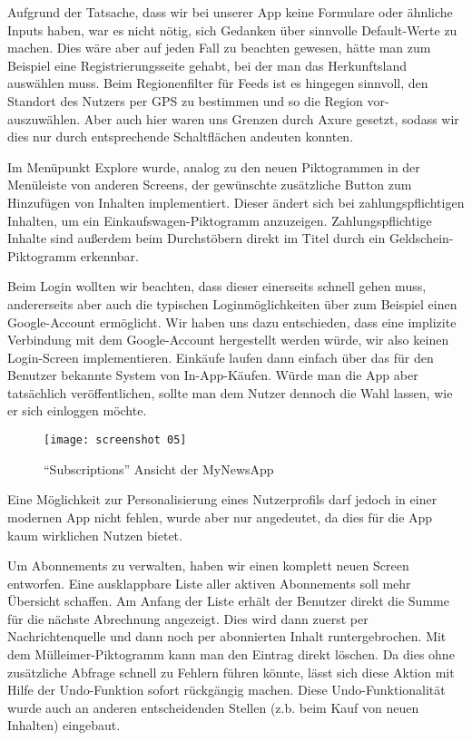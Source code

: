 Aufgrund der Tatsache, dass wir bei unserer App keine Formulare oder ähnliche Inputs haben, war es nicht nötig, sich Gedanken über sinnvolle Default-Werte zu machen. Dies wäre aber auf jeden Fall zu beachten gewesen, hätte man zum Beispiel eine Registrierungsseite gehabt, bei der man das Herkunftsland auswählen muss. Beim Regionenfilter für Feeds ist es hingegen sinnvoll, den Standort des Nutzers per GPS zu bestimmen und so die Region vor- auszuwählen. Aber auch hier waren uns Grenzen durch Axure gesetzt, sodass wir dies nur durch entsprechende Schaltflächen andeuten konnten.

Im Menüpunkt Explore wurde, analog zu den neuen Piktogrammen in der Menüleiste von anderen Screens, der gewünschte zusätzliche Button zum Hinzufügen von Inhalten implementiert. Dieser ändert sich bei zahlungspflichtigen Inhalten, um ein Einkaufswagen-Piktogramm anzuzeigen. Zahlungspflichtige Inhalte sind außerdem beim Durchstöbern direkt im Titel durch ein Geldschein-Piktogramm erkennbar.

Beim Login wollten wir beachten, dass dieser einerseits schnell gehen muss, andererseits aber auch die typischen Loginmöglichkeiten über zum Beispiel einen Google-Account ermöglicht. Wir haben uns dazu entschieden, dass eine implizite Verbindung mit dem Google-Account hergestellt werden würde, wir also keinen Login-Screen implementieren. Einkäufe laufen dann einfach über das für den Benutzer bekannte System von In-App-Käufen. Würde man die App aber tatsächlich veröffentlichen, sollte man dem Nutzer dennoch die Wahl lassen, wie er sich einloggen möchte.

\clearpage

\begin{wrapfigure}{L}{0.45\textwidth}
  \centering
  \texttt{[image: screenshot 05]}
  \caption{\enquote{Subscriptions} Ansicht der MyNewsApp}
  \label{fig:screenshot-05}
\end{wrapfigure}

Eine Möglichkeit zur Personalisierung eines Nutzerprofils darf jedoch in einer modernen App nicht fehlen, wurde aber nur angedeutet, da dies für die App kaum wirklichen Nutzen bietet.

Um Abonnements zu verwalten, haben wir einen komplett neuen Screen entworfen. Eine ausklappbare Liste aller aktiven Abonnements soll mehr Übersicht schaffen. Am Anfang der Liste erhält der Benutzer direkt die Summe für die nächste Abrechnung angezeigt. Dies wird dann zuerst per Nachrichtenquelle und dann noch per abonnierten Inhalt runtergebrochen. Mit dem Mülleimer-Piktogramm kann man den Eintrag direkt löschen. Da dies ohne zusätzliche Abfrage schnell zu Fehlern führen könnte, lässt sich diese Aktion mit Hilfe der Undo-Funktion sofort rückgängig machen. Diese Undo-Funktionalität wurde auch an anderen entscheidenden Stellen (z.b. beim Kauf von neuen Inhalten) eingebaut.
